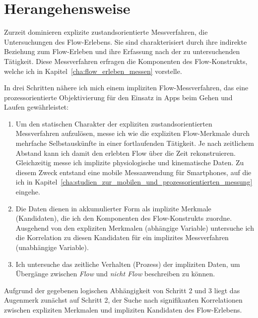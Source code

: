 

\section{Herangehensweise} 

\label{sec:herangehensweise}

Zurzeit dominieren explizite zustandsorientierte Messverfahren, die Untersuchungen des Flow-Erlebens. Sie sind charakterisiert durch ihre indirekte Beziehung zum Flow-Erleben und ihre Erfassung nach der zu untersuchenden Tätigkeit. Diese Messverfahren erfragen die Komponenten des Flow-Konstrukts, welche ich in Kapitel~\ref{cha:flow_erleben_messen} vorstelle. 

In drei Schritten nähere ich mich einem impliziten Flow-Messverfahren, das eine prozessorientierte Objektivierung für den Einsatz in Apps beim Gehen und Laufen gewährleistet: 
\begin{enumerate}
	\item Um den statischen Charakter der expliziten zustandsorientierten Messverfahren aufzulösen, messe ich wie \citet{Reinhardt2006, Schuler2009} die expliziten Flow-Merkmale durch mehrfache Selbstauskünfte in einer fortlaufenden Tätigkeit. Je nach zeitlichem Abstand kann ich damit den erlebten Flow über die Zeit rekonstruieren. Gleichzeitig messe ich implizite physiologische und kinematische Daten. Zu diesem Zweck entstand eine mobile Messanwendung für Smartphones, auf die ich in Kapitel~\ref{cha:studien_zur_mobilen_und_prozessorientierten_messung} eingehe.
	
	\item Die Daten dienen in akkumulierter Form als implizite Merkmale (Kandidaten), die ich den Komponenten des Flow-Konstrukts zuordne. Ausgehend von den expliziten Merkmalen (abhängige Variable) untersuche ich die Korrelation zu diesen Kandidaten für ein implizites Messverfahren (unabhängige Variable).
	
	\item Ich untersuche das zeitliche Verhalten (Prozess) der impliziten Daten, um Übergänge zwischen \emph{Flow} und \emph{nicht Flow} beschreiben zu können. 
\end{enumerate}

Aufgrund der gegebenen logischen Abhängigkeit von Schritt 2 und 3 liegt das Augenmerk zunächst auf Schritt 2, der Suche nach signifikanten Korrelationen zwischen expliziten Merkmalen und impliziten Kandidaten des Flow-Erlebens. 

